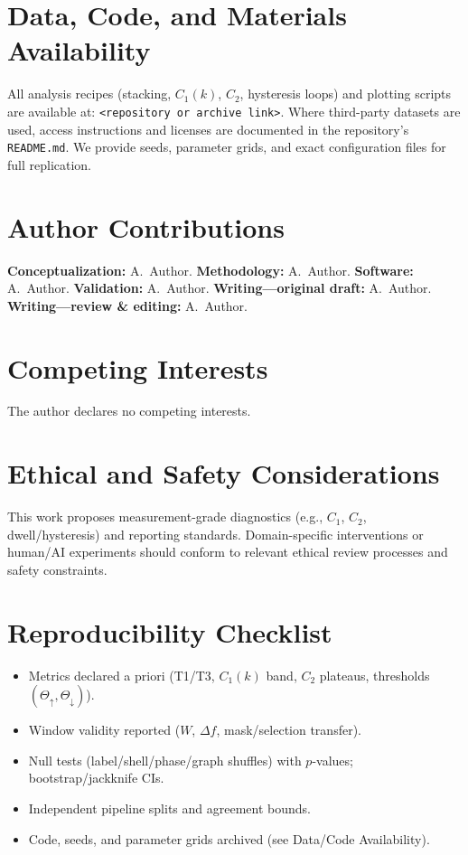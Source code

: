 \documentclass[12pt,a4paper,oneside]{scrreprt}
\begin{document}
\chapter*{Data, Code, and Materials Availability}
All analysis recipes (stacking, $C_1(k)$, $C_2$, hysteresis loops) and plotting scripts are available at: \texttt{<repository or archive link>}. 
Where third-party datasets are used, access instructions and licenses are documented in the repository’s \texttt{README.md}. 
We provide seeds, parameter grids, and exact configuration files for full replication.

\chapter*{Author Contributions}
\textbf{Conceptualization:} A.~Author. \quad
\textbf{Methodology:} A.~Author. \quad
\textbf{Software:} A.~Author. \quad
\textbf{Validation:} A.~Author. \quad
\textbf{Writing—original draft:} A.~Author. \quad
\textbf{Writing—review \& editing:} A.~Author.

\chapter*{Competing Interests}
The author declares no competing interests.

\chapter*{Ethical and Safety Considerations}
This work proposes measurement-grade diagnostics (e.g., $C_1$, $C_2$, dwell/hysteresis) and reporting standards. 
Domain-specific interventions or human/AI experiments should conform to relevant ethical review processes and safety constraints.

\chapter*{Reproducibility Checklist}
\begin{itemize}
  \item Metrics declared a priori (T1/T3, $C_1(k)$ band, $C_2$ plateaus, thresholds $(\Theta_\uparrow,\Theta_\downarrow)$).
  \item Window validity reported ($W$, $\Delta f$, mask/selection transfer).
  \item Null tests (label/shell/phase/graph shuffles) with $p$-values; bootstrap/jackknife CIs.
  \item Independent pipeline splits and agreement bounds.
  \item Code, seeds, and parameter grids archived (see Data/Code Availability).
\end{itemize}
\end{document}
